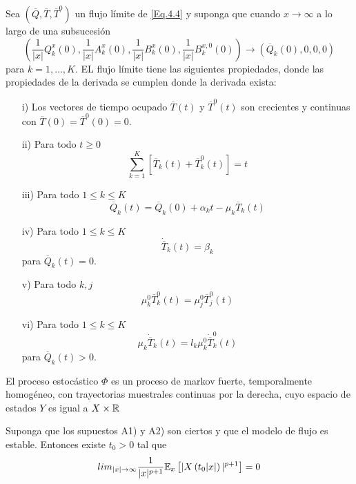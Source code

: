 \begin{Prop}
 Sea $\left(\overline{Q},\overline{T},\overline{T}^{0}\right)$ un flujo l\'imite de \ref{Eq.4.4} y suponga que cuando $x\rightarrow\infty$ a lo largo de
una subsucesi\'on
\[\left(\frac{1}{|x|}Q_{k}^{x}\left(0\right),\frac{1}{|x|}A_{k}^{x}\left(0\right),\frac{1}{|x|}B_{k}^{x}\left(0\right),\frac{1}{|x|}B_{k}^{x,0}\left(0\right)\right)\rightarrow\left(\overline{Q}_{k}\left(0\right),0,0,0\right)\]
para $k=1,\ldots,K$. EL flujo l\'imite tiene las siguientes
propiedades, donde las propiedades de la derivada se cumplen donde
la derivada exista:
\begin{itemize}
 \item[i)] Los vectores de tiempo ocupado $\overline{T}\left(t\right)$ y $\overline{T}^{0}\left(t\right)$ son crecientes y continuas con
$\overline{T}\left(0\right)=\overline{T}^{0}\left(0\right)=0$.
\item[ii)] Para todo $t\geq0$
\[\sum_{k=1}^{K}\left[\overline{T}_{k}\left(t\right)+\overline{T}_{k}^{0}\left(t\right)\right]=t\]
\item[iii)] Para todo $1\leq k\leq K$
\[\overline{Q}_{k}\left(t\right)=\overline{Q}_{k}\left(0\right)+\alpha_{k}t-\mu_{k}\overline{T}_{k}\left(t\right)\]
\item[iv)]  Para todo $1\leq k\leq K$
\[\dot{{\overline{T}}}_{k}\left(t\right)=\beta_{k}\] para $\overline{Q}_{k}\left(t\right)=0$.
\item[v)] Para todo $k,j$
\[\mu_{k}^{0}\overline{T}_{k}^{0}\left(t\right)=\mu_{j}^{0}\overline{T}_{j}^{0}\left(t\right)\]
\item[vi)]  Para todo $1\leq k\leq K$
\[\mu_{k}\dot{{\overline{T}}}_{k}\left(t\right)=l_{k}\mu_{k}^{0}\dot{{\overline{T}}}_{k}^{0}\left(t\right)\] para $\overline{Q}_{k}\left(t\right)>0$.
\end{itemize}
\end{Prop}


\begin{Lemma}\label{Lema.34.MeynDown}
El proceso estoc\'astico $\Phi$ es un proceso de markov fuerte,
temporalmente homog\'eneo, con trayectorias muestrales continuas
por la derecha, cuyo espacio de estados $Y$ es igual a
$X\times\mathbb{R}$
\end{Lemma}
\begin{Prop}
 Suponga que los supuestos A1) y A2) son ciertos y que el modelo de flujo es estable. Entonces existe $t_{0}>0$ tal que
\begin{equation}
 lim_{|x|\rightarrow\infty}\frac{1}{|x|^{p+1}}\mathbb{E}_{x}\left[|X\left(t_{0}|x|\right)|^{p+1}\right]=0
\end{equation}
\end{Prop}

